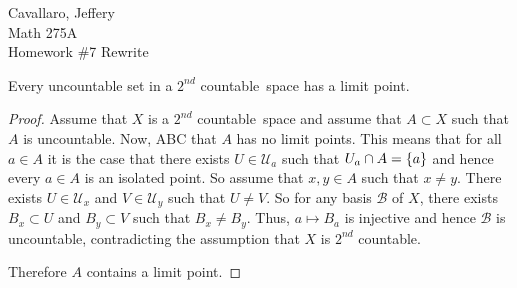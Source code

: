 \documentclass[letterpaper,12pt,fleqn]{article}
\newcommand{\U}{\mathcal{U}}
\newcommand{\B}{\mathcal{B}}
\renewcommand{\sc}{\(2^{nd}\) countable}
\begin{document}
Cavallaro, Jeffery \\
Math 275A \\
Homework \#7 Rewrite

\bigskip

\begin{theorem}[5.11]
  Every uncountable set in a \sc\ space has a limit point.
\end{theorem}

\begin{proof}
  Assume that \(X\) is a \sc\ space and assume that \(A\subset X\) such that \(A\) is uncountable.  Now, ABC that
  \(A\) has no limit points.  This means that for all \(a\in A\) it is the case that there exists \(U\in\U_a\)
  such that \(U_a\cap A=\{a\}\) and hence every \(a\in A\) is an isolated point.  So assume that \(x,y\in A\)
  such that \(x\ne y\).  There exists \(U\in\U_x\) and \(V\in\U_y\) such that \(U\ne V\).  So for any basis
  \(\B\) of \(X\), there exists \(B_x\subset U\) and \(B_y\subset V\) such that \(B_x\ne B_y\).  Thus,
  \(a\mapsto B_a\) is injective and hence \(\B\) is uncountable, contradicting the assumption that \(X\)
  is \sc.

  Therefore \(A\) contains a limit point.
\end{proof}
\end{document}
